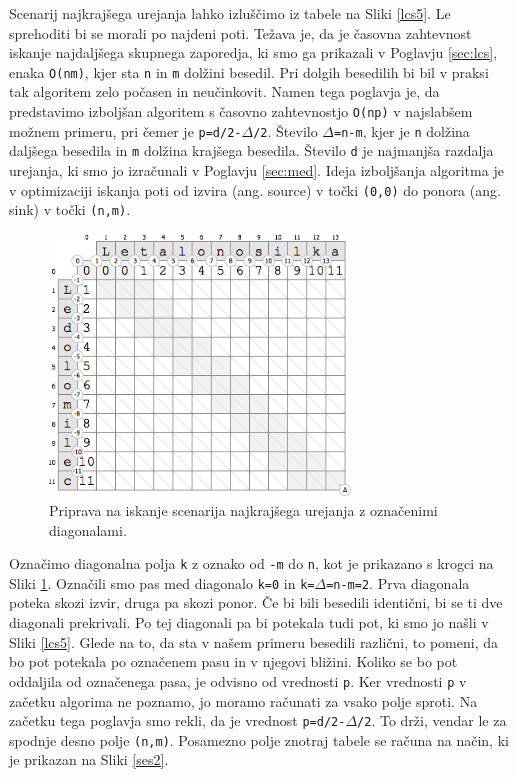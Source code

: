 \documentclass[a4paper, 12pt, twoside]{book}
\begin{document}
Scenarij najkrajšega urejanja lahko izluščimo iz tabele na Sliki \ref{lcs5}. Le sprehoditi bi se morali po najdeni poti. Težava je, da je časovna zahtevnost iskanje najdaljšega skupnega zaporedja, ki smo ga prikazali v Poglavju \ref{sec:lcs}, enaka {\tt O(nm)}, kjer sta {\tt n} in {\tt m} dolžini \linebreak besedil. Pri dolgih besedilih bi bil v praksi tak algoritem zelo počasen in neučinkovit. Namen tega poglavja je, da predstavimo izboljšan algoritem \cite{o-np} s časovno zahtevnostjo {\tt O(np)} v najslabšem možnem primeru, pri čemer je {\tt p=d/2-$\Delta$/2}. Število {\tt $\Delta$=n-m}, kjer je {\tt n} dolžina daljšega besedila in {\tt m} dolžina krajšega besedila. Število {\tt d} je najmanjša razdalja urejanja, ki smo jo izračunali v Poglavju \ref{sec:med}. Ideja izboljšanja algoritma je v optimizaciji iskanja poti od izvira (ang. source) v točki {\tt (0,0)} do ponora (ang. sink) v točki {\tt (n,m)}.

\begin{figure}[placement h]
\begin{center}
\includegraphics[width=8cm]{ses1.png}
\end{center}
\caption{Priprava na iskanje scenarija najkrajšega urejanja z označenimi diagonalami.}
\label{ses1}
\end{figure}

Označimo diagonalna polja {\tt k} z oznako od {\tt -m} do {\tt n}, kot je prikazano s krogci na Sliki \ref{ses1}. Označili smo pas med diagonalo {\tt k=0} in {\tt k=$\Delta$=n-m=2}. Prva diagonala poteka skozi izvir, druga pa skozi ponor. Če bi bili besedili identični, bi se ti dve diagonali prekrivali. Po tej diagonali pa bi potekala tudi pot, ki smo jo našli v Sliki \ref{lcs5}. Glede na to, da sta v našem primeru besedili različni, to pomeni, da bo pot potekala po označenem pasu in v njegovi bližini. Koliko se bo pot oddaljila od označenega pasa, je odvisno od vrednosti {\tt p}. Ker vrednosti {\tt p} v začetku algorima ne poznamo, jo moramo računati za vsako polje sproti. Na začetku tega poglavja smo rekli, da je vrednost {\tt p=d/2-$\Delta$/2}. To drži, vendar le za spodnje desno polje {\tt (n,m)}. Posamezno polje znotraj tabele se računa na način, ki je prikazan na Sliki \ref{ses2}.
\end{document}
